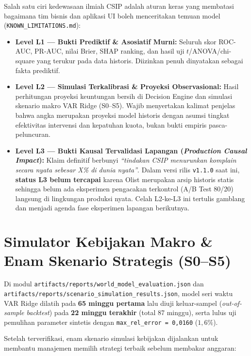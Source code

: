 \documentclass[11pt,a4paper,oneside]{book}
\newcommand{\code}[1]{{\small\nolinkurl{#1}}}
\begin{document}
Salah satu ciri kedewasaan ilmiah CSIP adalah aturan keras yang membatasi bagaimana tim bisnis dan aplikasi UI boleh menceritakan temuan model (\code{KNOWN_LIMITATIONS.md}):
\begin{itemize}
  \item \textbf{Level L1 --- Bukti Prediktif \& Asosiatif Murni:} Seluruh skor ROC-AUC, PR-AUC, nilai Brier, SHAP ranking, dan hasil uji $t$/ANOVA/chi-square yang terukur pada data historis. Diizinkan penuh dinyatakan sebagai fakta prediktif.
  \item \textbf{Level L2 --- Simulasi Terkalibrasi \& Proyeksi Observasional:} Hasil perhitungan proyeksi keuntungan bersih di Decision Engine dan simulasi skenario makro VAR Ridge (S0--S5). Wajib menyertakan kalimat penjelas bahwa angka merupakan proyeksi model historis dengan asumsi tingkat efektivitas intervensi dan kepatuhan kuota, bukan bukti empiris pasca-peluncuran.
  \item \textbf{Level L3 --- Bukti Kausal Tervalidasi Lapangan (\emph{Production Causal Impact}):} Klaim definitif berbunyi \emph{``tindakan CSIP menurunkan komplain secara nyata sebesar X\% di dunia nyata''}. Dalam versi rilis \code{v1.1.0} saat ini, \textbf{status L3 belum tercapai} karena Olist merupakan arsip historis statis sehingga belum ada eksperimen pengacakan terkontrol (A/B Test 80/20) langsung di lingkungan produksi nyata. Celah L2-ke-L3 ini tertulis gamblang dan menjadi agenda fase eksperimen lapangan berikutnya.
\end{itemize}

\section{Simulator Kebijakan Makro \& Enam Skenario Strategis (S0--S5)}

Di modul \code{artifacts/reports/world_model_evaluation.json} dan \code{artifacts/reports/scenario_simulation_results.json}, model seri waktu VAR Ridge dilatih pada \textbf{65 minggu pertama} lalu diuji keluar-sampel (\emph{out-of-sample backtest}) pada \textbf{22 minggu terakhir} (total 87 minggu), serta lulus uji pemulihan parameter sintetis dengan \code{max_rel_error = 0,0160} ($1{,}6\%$).

Setelah terverifikasi, enam skenario simulasi kebijakan dijalankan untuk membantu manajemen memilih strategi terbaik sebelum membakar anggaran:
\end{document}
